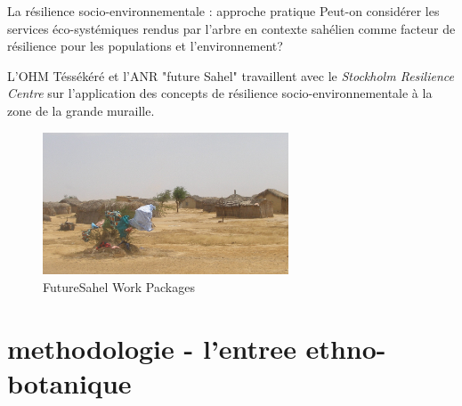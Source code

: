 \documentclass[newPxFont]{beamer}
\begin{document}
\begin{frame}[c]{La résilience socio-environnementale : approche pratique}
\vspace{-1cm}
Peut-on considérer les services éco-systémiques rendus par l'arbre en contexte sahélien comme
facteur de résilience pour les populations et l'environnement?

L'OHM Téssékéré et l'ANR "future Sahel" travaillent avec le \textit{Stockholm Resilience Centre} sur l'application des concepts de résilience socio-environnementale à la zone de la grande muraille.

\begin{figure}
	\centering
	\includegraphics[width = 0.65\textwidth]{img/PA310152.JPG}
	\caption{FutureSahel Work Packages}
\end{figure}
\end{frame}


\section{methodologie - l'entree ethno-botanique}
\end{document}
